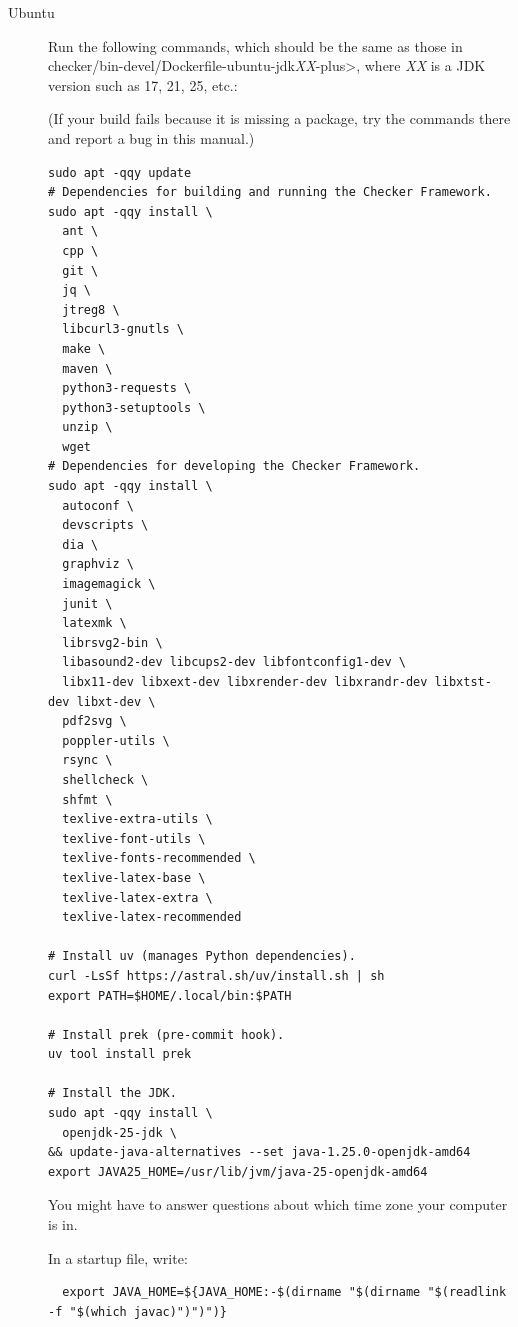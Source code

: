 \begin{description}
\item[Ubuntu]
\label{building-prerequisites-ubuntu}
  Run the following commands, which should be the same as those in
  \<checker/bin-devel/Dockerfile-ubuntu-jdk\emph{XX}-plus>, where \emph{XX}
  is a JDK version such as 17, 21, 25, etc.:

(If your build fails
because it is missing a package, try the commands there and report a bug
in this manual.)


\begin{Verbatim}
sudo apt -qqy update
# Dependencies for building and running the Checker Framework.
sudo apt -qqy install \
  ant \
  cpp \
  git \
  jq \
  jtreg8 \
  libcurl3-gnutls \
  make \
  maven \
  python3-requests \
  python3-setuptools \
  unzip \
  wget
# Dependencies for developing the Checker Framework.
sudo apt -qqy install \
  autoconf \
  devscripts \
  dia \
  graphviz \
  imagemagick \
  junit \
  latexmk \
  librsvg2-bin \
  libasound2-dev libcups2-dev libfontconfig1-dev \
  libx11-dev libxext-dev libxrender-dev libxrandr-dev libxtst-dev libxt-dev \
  pdf2svg \
  poppler-utils \
  rsync \
  shellcheck \
  shfmt \
  texlive-extra-utils \
  texlive-font-utils \
  texlive-fonts-recommended \
  texlive-latex-base \
  texlive-latex-extra \
  texlive-latex-recommended

# Install uv (manages Python dependencies).
curl -LsSf https://astral.sh/uv/install.sh | sh
export PATH=$HOME/.local/bin:$PATH

# Install prek (pre-commit hook).
uv tool install prek

# Install the JDK.
sudo apt -qqy install \
  openjdk-25-jdk \
&& update-java-alternatives --set java-1.25.0-openjdk-amd64
export JAVA25_HOME=/usr/lib/jvm/java-25-openjdk-amd64
\end{Verbatim}


  You might have to answer questions about which time zone your computer is in.

In a startup file, write:
\begin{smaller}
\begin{Verbatim}
  export JAVA_HOME=${JAVA_HOME:-$(dirname "$(dirname "$(readlink -f "$(which javac)")")")}
\end{Verbatim}
\end{smaller}


\end{description}
